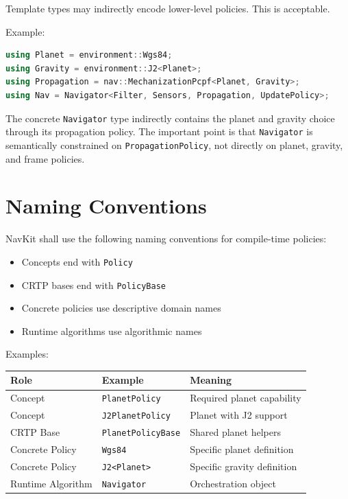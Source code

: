 \documentclass[11pt]{article}
\begin{document}
Template types may indirectly encode lower-level policies. This is acceptable.

Example:

\begin{lstlisting}[language=C++]
using Planet = environment::Wgs84;
using Gravity = environment::J2<Planet>;
using Propagation = nav::MechanizationPcpf<Planet, Gravity>;
using Nav = Navigator<Filter, Sensors, Propagation, UpdatePolicy>;
\end{lstlisting}

The concrete \texttt{Navigator} type indirectly contains the planet and gravity
choice through its propagation policy. The important point is that
\texttt{Navigator} is semantically constrained on \texttt{PropagationPolicy},
not directly on planet, gravity, and frame policies.

\section{Naming Conventions}

NavKit shall use the following naming conventions for compile-time policies:

\begin{itemize}
    \item Concepts end with \texttt{Policy}
    \item CRTP bases end with \texttt{PolicyBase}
    \item Concrete policies use descriptive domain names
    \item Runtime algorithms use algorithmic names
\end{itemize}

Examples:

\begin{center}
\begin{tabular}{lll}
\toprule
\textbf{Role} & \textbf{Example} & \textbf{Meaning} \\
\midrule
Concept & \texttt{PlanetPolicy} & Required planet capability \\
Concept & \texttt{J2PlanetPolicy} & Planet with J2 support \\
CRTP Base & \texttt{PlanetPolicyBase} & Shared planet helpers \\
Concrete Policy & \texttt{Wgs84} & Specific planet definition \\
Concrete Policy & \texttt{J2<Planet>} & Specific gravity definition \\
Runtime Algorithm & \texttt{Navigator} & Orchestration object \\
\bottomrule
\end{tabular}
\end{center}
\end{document}
